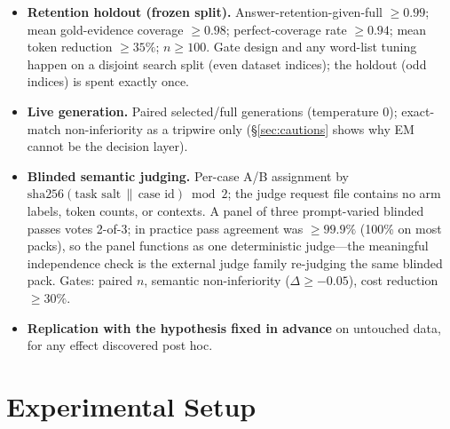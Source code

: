 \documentclass[11pt]{article}
\begin{document}
\begin{itemize}
\item[\textbf{L1}] \textbf{Retention holdout (frozen split).}
Answer-retention-given-full $\ge 0.99$; mean gold-evidence coverage $\ge
0.98$; perfect-coverage rate $\ge 0.94$; mean token reduction $\ge 35\%$;
$n \ge 100$. Gate design and any word-list tuning happen on a disjoint
search split (even dataset indices); the holdout (odd indices) is spent
exactly once.
\item[\textbf{L2}] \textbf{Live generation.} Paired selected/full
generations (temperature 0); exact-match non-inferiority as a tripwire
only (\S\ref{sec:cautions} shows why EM cannot be the decision layer).
\item[\textbf{L3}] \textbf{Blinded semantic judging.} Per-case A/B
assignment by $\mathrm{sha256}(\text{task salt} \,\|\, \text{case id})
\bmod 2$; the judge request file contains no arm labels, token counts, or
contexts. A panel of three prompt-varied blinded passes votes 2-of-3; in
practice pass agreement was ${\ge}99.9\%$ (100\% on most packs), so the
panel functions as one deterministic judge---the meaningful independence
check is the external judge family re-judging the same blinded pack.
Gates: paired $n$, semantic non-inferiority ($\Delta \ge -0.05$), cost
reduction $\ge 30\%$.
\item[\textbf{L4}] \textbf{Replication with the hypothesis fixed in
advance} on untouched data, for any effect discovered post hoc.
\end{itemize}

\section{Experimental Setup}
\end{document}
